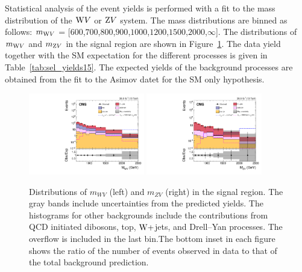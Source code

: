 Statistical analysis of the event yields is performed with a fit to the mass distribution of the $\mathrm{W} V$ or $\mathrm{Z} V$ system. The mass distributions are binned as follows: $m_{\mathrm{W} V}$ = [$600$,$700$,$800$,$900$,$1000$,$1200$,$1500$,$2000$,$\infty$]. The distributions of $m_{\mathrm{W} V}$ and $m_{\mathrm{Z} V}$ in the signal region are shown in Figure~\ref{fig:signal2}. The data yield together with the SM expectation for the different processes is given in Table~\ref{tab:sel_yields15}. The expected yields of the background processes are obtained from the fit to the Asimov datet for the SM only hypothesis. 


\begin{figure}[!htbp]
\centering
\includegraphics[width=0.45\textwidth]{Plots/plots/wv_signal.pdf}
\includegraphics[width=0.45\textwidth]{Plots/plots/zv_signal.pdf}
\caption{Distributions of $m_{WV}$ (left) and $m_{ZV}$ (right) in the signal region. The gray bands include uncertainties from the predicted yields. The histograms for other backgrounds include the contributions from QCD initiated dibosons, top, $\mathrm{W}+$jets, and Drell--Yan processes. The overflow is included in the last bin.The bottom inset in each figure shows the ratio of the number of events observed in data to that of the total background prediction.}
\label{fig:signal2}
\end{figure}

